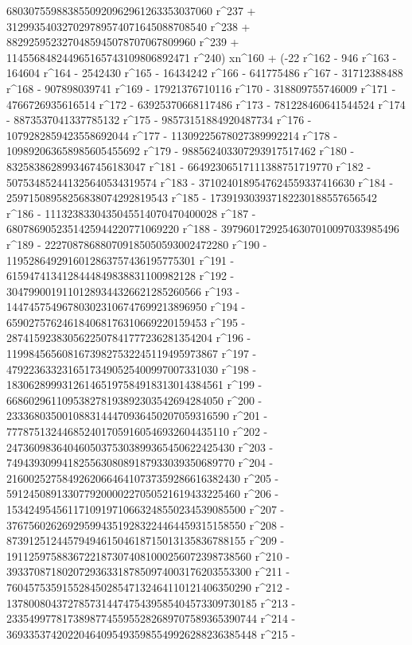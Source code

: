        6803075598838550920962961263353037060 r^237 + 
       312993540327029789574071645088708540 r^238 + 
       8829259523270485945078707067809960 r^239 + 
       114556848244965165743109806892471 r^240) xn^160 + (-22 r^162 - 
       946 r^163 - 164604 r^164 - 2542430 r^165 - 16434242 r^166 - 
       641775486 r^167 - 31712388488 r^168 - 907898039741 r^169 - 
       17921376710116 r^170 - 318809755746009 r^171 - 
       4766726935616514 r^172 - 63925370668117486 r^173 - 
       781228460641544524 r^174 - 8873537041337785132 r^175 - 
       98573151884920487734 r^176 - 1079282859423558692044 r^177 - 
       11309225678027389992214 r^178 - 
       109892063658985605455692 r^179 - 
       988562403307293917517462 r^180 - 
       8325838628993467456183047 r^181 - 
       66492306517111388751719770 r^182 - 
       507534852441325640534319574 r^183 - 
       3710240189547624559337416630 r^184 - 
       25971508958256838074292819543 r^185 - 
       173919303937182230188557656542 r^186 - 
       1113238330435045514070470400028 r^187 - 
       6807869052351425944220771069220 r^188 - 
       39796017292546307010097033985496 r^189 - 
       222708786880709185050593002472280 r^190 - 
       1195286492916012863757436195775301 r^191 - 
       6159474134128444849838831100982128 r^192 - 
       30479900191101289344326621285260566 r^193 - 
       144745754967803023106747699213896950 r^194 - 
       659027576246184068176310669220159453 r^195 - 
       2874159238305622507841777236281354204 r^196 - 
       11998456560816739827532245119495973867 r^197 - 
       47922363323165173490525400997007331030 r^198 - 
       183062899931261465197584918313014384561 r^199 - 
       668602961109538278193892303542694284050 r^200 - 
       2333680350010883144470936450207059316590 r^201 - 
       7778751324468524017059160546932604435110 r^202 - 
       24736098364046050375303899365450622425430 r^203 - 
       74943930994182556308089187933039350689770 r^204 - 
       216002527584926206646410737359286616382430 r^205 - 
       591245089133077920000227050521619433225460 r^206 - 
       1534249545611710919710663248550234539085500 r^207 - 
       3767560262692959943519283224464459315158550 r^208 - 
       8739125124457949461504618715013135836788155 r^209 - 
       19112597588367221873074081000256072398738560 r^210 - 
       39337087180207293633187850974003176203553300 r^211 - 
       76045753591552845028547132464110121406350290 r^212 - 
       137800804372785731447475439585404573309730185 r^213 - 
       233549977817389877455955282689707589365390744 r^214 - 
       369335374202204640954935985549926288236385448 r^215 - 
